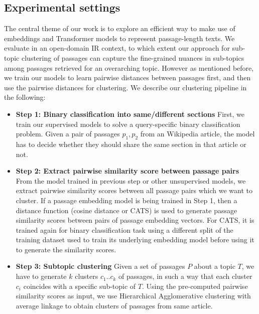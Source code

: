 \subsection{Experimental settings} The central theme of our work is to explore an efficient way to make use of embeddings and Transformer models to represent passage-length texts. We evaluate in an open-domain IR context, to which extent our approach for sub-topic clustering of passages can capture the fine-grained nuances in sub-topics among passages retrieved for an overarching topic. However as mentioned before, we train our models to learn pairwise distances between passages first, and then use the pairwise distances for clustering. We describe our clustering pipeline in the following:
\begin{itemize}[leftmargin=.15in]
    \item \textbf{Step 1: Binary classification into same/different sections} First, we train our supervised models to solve a query-specific binary classification problem. Given a pair of passages $p_1, p_2$ from an Wikipedia article, the model has to decide whether they should share the same section in that article or not.
    \item \textbf{Step 2: Extract pairwise similarity score between passage pairs} From the model trained in previous step or other unsupervised models, we extract pairwise similarity scores between all passage pairs which we want to cluster. If a passage embedding model is being trained in Step 1, then a distance function (cosine distance or CATS) is used to generate passage similarity scores between pairs of passage embedding vectors. For CATS, it is trained again for binary classification task using a different split of the training dataset used to train its underlying embedding model before using it to generate the similarity scores.
    \item \textbf{Step 3: Subtopic clustering} Given a set of passages $P$ about a topic $T$, we have to generate $k$ clusters $c_1 .. c_k$ of passages, in such a way that each cluster $c_i$ coincides with a specific sub-topic of $T$. Using the pre-computed pairwise similarity scores as input, we use Hierarchical Agglomerative clustering with average linkage to obtain clusters of passages from same article.
\end{itemize}

